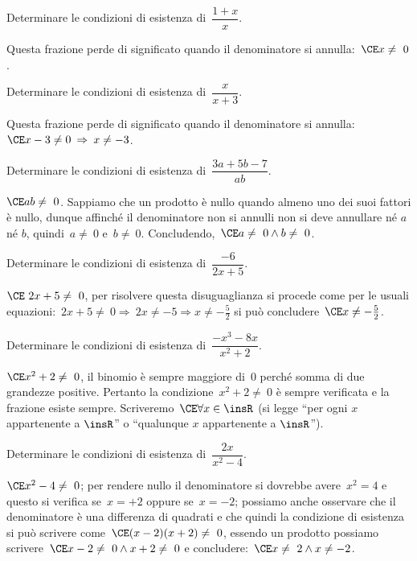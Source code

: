 \begin{exrig}
 \begin{esempio}
Determinare le condizioni di esistenza di~$\dfrac{1+x}{x}$.

Questa frazione perde di significato quando il denominatore si annulla:~$\CE x\neq~0$.
 \end{esempio}

 \begin{esempio}
Determinare le condizioni di esistenza di~$\dfrac{x}{x+3}$.

Questa frazione perde di significato quando il denominatore si annulla:~$\CE x-3\neq 0\:\Rightarrow\: x\neq -3$.
 \end{esempio}

 \begin{esempio}
Determinare le condizioni di esistenza di~$\dfrac{3a+5b-7}{ab}$.

$\CE ab\neq~0$. Sappiamo che un prodotto è nullo quando almeno uno dei suoi fattori è nullo,
dunque affinché il denominatore non si annulli non si deve annullare né $a$ né $b$,
quindi~$a\neq~0$ e~$b\neq~0$. Concludendo,~$\CE a\neq~0\wedge b\neq~0$.
 \end{esempio}

 \begin{esempio}
Determinare le condizioni di esistenza di~$\dfrac{-6}{2x+5}$.

$\CE~2x+5\neq~0$, per risolvere questa disuguaglianza si procede come per le usuali
equazioni:~$2x+5\neq~0 \Rightarrow~2x\neq -5\Rightarrow x\neq -{\frac{5}{2}}$ si può concludere~$\CE x\neq -{\frac{5}{2}}$.
 \end{esempio}

 \begin{esempio}
Determinare le condizioni di esistenza di~$\dfrac{-x^{3}-8x}{x^{2}+2}$.

$\CE x^{2}+2\neq~0$, il binomio è sempre maggiore di~$0$ perché somma di due grandezze positive.
Pertanto la condizione~$x^{2}+2\neq~0$ è sempre verificata e la frazione esiste sempre. Scriveremo~$\CE \forall x\in \insR$ (si legge ``per ogni $x$ appartenente a $\insR$'' o ``qualunque $x$ appartenente a $\insR$'').
 \end{esempio}

 \begin{esempio}
Determinare le condizioni di esistenza di~$\dfrac{2x}{x^{2}-4}$.

$\CE x^{2}-4\neq~0$; per rendere nullo il denominatore si dovrebbe avere~$x^2 = 4$ e questo si verifica se~$x = +2$
oppure se~$x = -2$; possiamo anche osservare che il denominatore è una differenza di quadrati e che quindi la
condizione di esistenza si può scrivere come~$\CE (x-2)(x+2)\neq~0$, essendo un prodotto possiamo
scrivere~$\CE x-2\neq~0\wedge x+2\neq~0$ e concludere:~$\CE x\neq~2\wedge x\neq -2$.
 \end{esempio}
\end{exrig}

